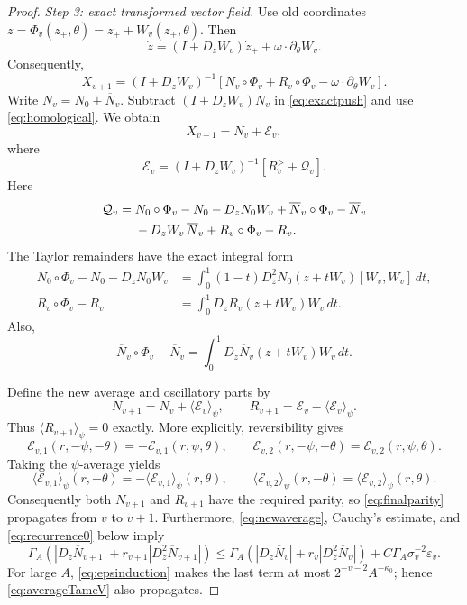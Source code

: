 \documentclass[10pt,a4paper]{amsart}
\newcommand{\av}[1]{\langle #1\rangle}
\newcommand{\eps}{\varepsilon}
\begin{document}
\begin{proof}
\smallskip
\noindent\emph{Step 3: exact transformed vector field.}
Use old coordinates $z=\Phi_v(z_+,\theta)=z_++W_v(z_+,\theta)$.
Then
\[
 \dot z=(I+D_zW_v)\dot z_+
       +\omega\cdot\partial_\theta W_v.
\]
Consequently,
\begin{equation}\label{eq:exactpush}
 X_{v+1}
 =(I+D_zW_v)^{-1}
 \left[
 N_v\circ\Phi_v+R_v\circ\Phi_v
 -\omega\cdot\partial_\theta W_v
 \right].
\end{equation}
Write $N_v=N_0+\overline N_v$.  Subtract
$(I+D_zW_v)N_v$ in \eqref{eq:exactpush} and use
\eqref{eq:homological}.  We obtain
\begin{equation}\label{eq:pushsplit}
 X_{v+1}
 =N_v+\mathcal E_v,
\end{equation}
where
\begin{equation}\label{eq:Ev}
 \mathcal E_v
 =(I+D_zW_v)^{-1}
 \left[
 R_v^>+\mathcal Q_v
 \right].
\end{equation}
Here
\begin{align}
 \mathcal Q_v={}&
 N_0\circ\Phi_v-N_0-D_zN_0W_v
 +\overline N_v\circ\Phi_v-\overline N_v
\notag\\
&-D_zW_v\,\overline N_v
 +R_v\circ\Phi_v-R_v .
\label{eq:Qv}
\end{align}
The Taylor remainders have the exact integral form
\begin{align}
 N_0\circ\Phi_v-N_0-D_zN_0W_v
 &=\int_0^1(1-t)
 D_z^2N_0(z+tW_v)[W_v,W_v]\,dt,
 \label{eq:TaylorN}\\
 R_v\circ\Phi_v-R_v
 &=\int_0^1
 D_zR_v(z+tW_v)W_v\,dt.
\label{eq:TaylorR}
\end{align}
Also,
\begin{equation}\label{eq:TaylorAverage}
 \overline N_v\circ\Phi_v-\overline N_v
 =\int_0^1D_z\overline N_v(z+tW_v)W_v\,dt.
\end{equation}

Define the new average and oscillatory parts by
\begin{equation}\label{eq:newaverage}
 N_{v+1}=N_v+\av{\mathcal E_v}_{\psi},\qquad
 R_{v+1}=\mathcal E_v-\av{\mathcal E_v}_{\psi}.
\end{equation}
Thus $\av{R_{v+1}}_{\psi}=0$ exactly.  More explicitly, reversibility gives
\[
 \mathcal E_{v,1}(r,-\psi,-\theta)
 =-\mathcal E_{v,1}(r,\psi,\theta),\qquad
 \mathcal E_{v,2}(r,-\psi,-\theta)
 = \mathcal E_{v,2}(r,\psi,\theta).
\]
Taking the $\psi$-average yields
\[
 \av{\mathcal E_{v,1}}_\psi(r,-\theta)
 =-\av{\mathcal E_{v,1}}_\psi(r,\theta),\qquad
 \av{\mathcal E_{v,2}}_\psi(r,-\theta)
 = \av{\mathcal E_{v,2}}_\psi(r,\theta).
\]
Consequently both $N_{v+1}$ and $R_{v+1}$ have the required parity, so
\eqref{eq:finalparity} propagates from $v$ to $v+1$.
Furthermore, \eqref{eq:newaverage}, Cauchy's estimate, and
\eqref{eq:recurrence0} below imply
\[
 \Gamma_A\left(
 |D_z\overline N_{v+1}|+
 r_{v+1}|D_z^2\overline N_{v+1}|
 \right)
 \leq
 \Gamma_A\left(
 |D_z\overline N_v|+
 r_v|D_z^2\overline N_v|
 \right)
 +C\Gamma_A\sigma_v^{-2}\eps_v .
\]
For large $A$, \eqref{eq:epsinduction} makes the last term at most
$2^{-v-2}A^{-\kappa_0}$; hence \eqref{eq:averageTameV} also propagates.


\end{proof}
\end{document}
